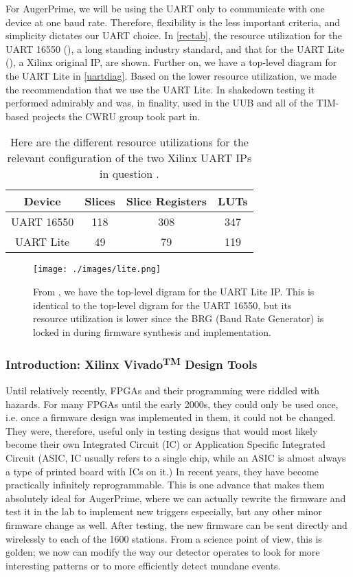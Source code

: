 For AugerPrime, we will be using the UART only to communicate with one device at one baud rate. Therefore, flexibility is the less important criteria, and simplicity dictates our UART choice. In \autoref{rectab}, the resource utilization for the UART 16550 (\cite{16550}), a long standing industry standard, and that for the UART Lite (\cite{lite}), a Xilinx original IP, are shown. Further on, we have a top-level diagram for the UART Lite in \autoref{uartdiag}. Based on the lower resource utilization, we made the recommendation that we use the UART Lite. In shakedown testing it performed admirably and was, in finality, used in the UUB and all of the TIM-based projects the CWRU group took part in.
\begin{table}[h!]
\centering
\begin{tabular}{|c|c|c|c|} \hline
Device & Slices & Slice Registers & LUTs \\ \hline
UART 16550 & 118 & 308 & 347  \\ \hline
UART Lite & 49 & 79 &119  \\ \hline
\end{tabular}
\caption[FPGA UART Utilization Comparison]{Here are the different resource utilizations for the relevant configuration of the two Xilinx UART IPs in question \cite{lite, 16550}.}
\label{rectab}
\end{table}

\begin{figure}[h!]
\centering
\texttt{[image: ./images/lite.png]}
\caption[UART Lite Top-Level Diagram]{From \textcite{lite}, we have the top-level digram for the UART Lite IP. This is identical to the top-level digram for the UART 16550, but its resource utilization is lower since the BRG (Baud Rate Generator) is locked in during firmware synthesis and implementation.}
\label{uartdiag}
\end{figure}

\subsubsection{Introduction: Xilinx Vivado\textsuperscript{TM} Design Tools}
\label{vivado}
Until relatively recently, FPGAs and their programming were riddled with hazards. For many FPGAs until the early 2000s, they could only be used once, i.e. once a firmware design was implemented in them, it could not be changed. They were, therefore, useful only in testing designs that would most likely become their own Integrated Circuit (IC) or Application Specific Integrated Circuit (ASIC, IC usually refers to a single chip, while an ASIC is almost always a type of printed board with ICs on it.) In recent years, they have become practically infinitely reprogrammable. This is one advance that makes them absolutely ideal for AugerPrime, where we can actually rewrite the firmware and test it in the lab to implement new triggers especially, but any other minor firmware change as well. After testing, the new firmware can be sent directly and wirelessly to each of the 1600 stations. From a science point of view, this is golden; we now can modify the way our detector operates to look for more interesting patterns or to more efficiently detect mundane events.

